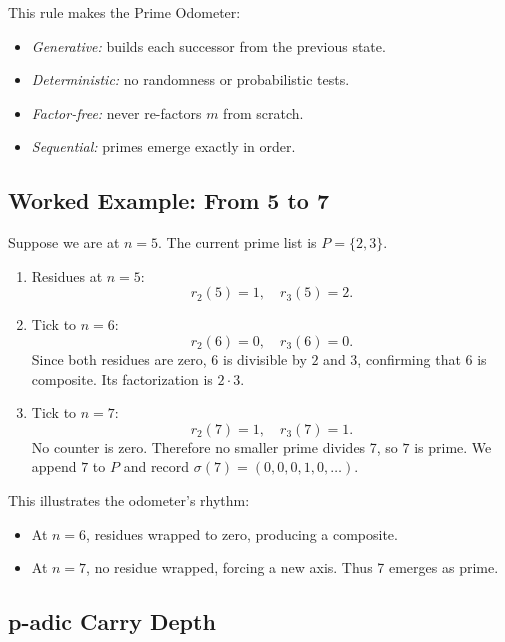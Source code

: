 \documentclass[11pt]{article}
\theoremstyle{definition}
\begin{document}
\begin{studentnote}
This rule makes the Prime Odometer:
\begin{itemize}
  \item \emph{Generative:} builds each successor from the previous state.
  \item \emph{Deterministic:} no randomness or probabilistic tests.
  \item \emph{Factor-free:} never re-factors $m$ from scratch.
  \item \emph{Sequential:} primes emerge exactly in order.
\end{itemize}
\end{studentnote}

\subsection{Worked Example: From 5 to 7}

Suppose we are at $n=5$. The current prime list is $P = \{2,3\}$.

\begin{enumerate}
  \item Residues at $n=5$:  
        \[
        r_2(5) = 1, \quad r_3(5) = 2.
        \]
  \item Tick to $n=6$:  
        \[
        r_2(6) = 0, \quad r_3(6) = 0.
        \]
        Since both residues are zero, $6$ is divisible by $2$ and $3$, 
        confirming that $6$ is composite. 
        Its factorization is $2 \cdot 3$.
  \item Tick to $n=7$:  
        \[
        r_2(7) = 1, \quad r_3(7) = 1.
        \]
        No counter is zero.  
        Therefore no smaller prime divides 7, 
        so $7$ is prime.  
        We append $7$ to $P$ and record $\sigma(7) = (0,0,0,1,0,\dots)$.
\end{enumerate}

\begin{studentexample}
This illustrates the odometer’s rhythm:
\begin{itemize}
  \item At $n=6$, residues wrapped to zero, producing a composite.
  \item At $n=7$, no residue wrapped, forcing a new axis.  
        Thus 7 emerges as prime.
\end{itemize}
\end{studentexample}

\subsection{p-adic Carry Depth}
\end{document}
